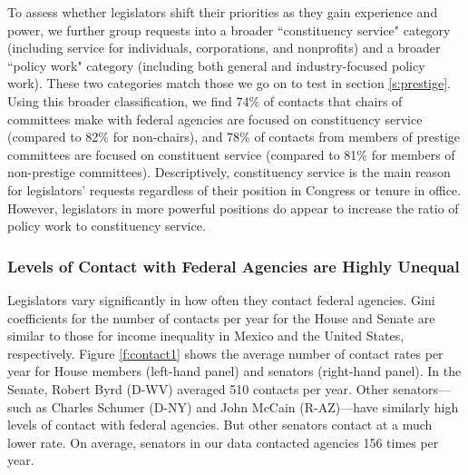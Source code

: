 \documentclass[12pt]{article}
\begin{document}
To assess whether legislators shift their priorities as they gain experience and power, we further group requests into a broader ``constituency service"  category (including service for individuals, corporations, and nonprofits) and a broader ``policy work" category (including both general and industry-focused policy work). These two categories match those we go on to test in section \ref{s:prestige}. 
Using this broader classification, we find 74\% of contacts that chairs of committees make with federal agencies are focused on constituency service (compared to 82\% for non-chairs), and 78\% of contacts from members of prestige committees are focused on constituent service (compared to 81\% for members of non-prestige committees).
Descriptively, constituency service is the main reason for legislators' requests regardless of their position in Congress or tenure in office. However, legislators in more powerful positions do appear to increase the ratio of policy work to constituency service.  

\subsubsection{Levels of Contact with Federal Agencies are Highly Unequal}
Legislators vary significantly in how often they contact federal agencies. Gini coefficients for the number of contacts per year for the House and Senate are similar to those for income inequality in Mexico and the United States, respectively. Figure \ref{f:contact1} shows the average number of contact rates per year for House members (left-hand panel) and senators (right-hand panel). 
In the Senate, Robert Byrd (D-WV) averaged 510 contacts per year. Other senators---such as Charles Schumer (D-NY) and John McCain (R-AZ)---have similarly high levels of contact with federal agencies. But other senators contact at a much lower rate. 
On average, senators in our data contacted agencies 156 times per year.   
 
\end{document}

